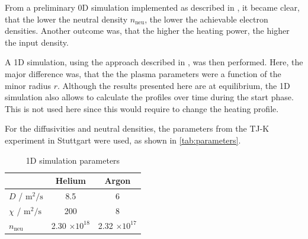 


From a preliminary 0D simulation implemented as described in \cite{plasmaParameterLimitsLechte2002}, it became clear, that the lower the neutral density $n_\mathrm{neu}$, the lower the achievable electron densities.
Another outcome was, that the higher the heating power, the higher the input density.

A 1D simulation, using the approach described in \cite{birkenmaierModeling2008}, was then performed.
Here, the major difference was, that the the plasma parameters were a function of the minor radius $r$.
Although the results presented here are at equilibrium, the 1D simulation also allows to calculate the profiles over time during the start phase. This is not used here since this would require to change the heating profile.

For the diffusivities and neutral densities, the parameters from the TJ-K experiment in Stuttgart were used, as shown in \autoref{tab:parameters}.

\begin{table}[H]
  \caption{1D simulation parameters}
  \centering
  \begin{tabular}{lSS}
                                              & {Helium}               & {Argon}                 \\
    \hline
    $D$ / $\si{\meter\squared\per\second}$    & 8.5                   & 6                     \\
    $\chi$ / $\si{\meter\squared\per\second}$ & 200                   & 8                     \\
    $n_\mathrm{neu}$                          & 2.30 $\times 10^{18}$ & 2.32 $\times 10^{17}$ \\
  \end{tabular}
  \label{tab:parameters}
\end{table}


